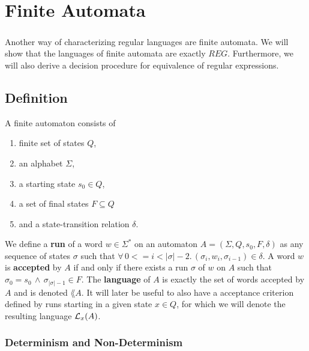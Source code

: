 \documentclass[11pt,a4paper,oneside]{book}
\begin{document}
            

    \chapter{Finite Automata}
        \paragraph{} 
        Another way of characterizing regular languages are finite automata. 
        We will show that the languages of finite automata are exactly $REG$. 
        Furthermore, we will also derive a decision procedure for equivalence of regular expressions.

        \section{Definition}
            A finite automaton consists of
            \begin{enumerate}
                \item
                    finite set of states $Q$, 
                \item 
                    an alphabet $\Sigma$, 
                \item 
                    a starting state $s_0 \in Q$, 
                \item 
                    a set of final states $F \subseteq Q$ 
                \item 
                    and a state-transition relation $\delta$. \cite{DBLP:books/daglib/0011126}
            \end{enumerate}

                We define a \textbf{run} of a word $w \in \Sigma^*$ on an automaton $A = (\Sigma, Q, s_0, F, \delta)$ as any sequence of states $\sigma$ such that 
                $\forall \, 0 <= i < \vert\sigma\vert-2. \, (\sigma_i, w_i, \sigma_{i-1}) \in \delta$.
            A word $w$ is \textbf{accepted} by $A$ if and only if there exists a run $\sigma$ of $w$ on $A$ such that $\sigma_0 = s_0 \, \wedge \, \sigma_{\vert\sigma\vert-1} \in F$.
            The \textbf{language} of $A$ is exactly the set of words accepted by $A$ and is denoted $\lang{A}$. 
            It will later be useful to also have a acceptance criterion defined by runs starting in a given state $x \in Q$, for which we will denote the resulting language $\mathcal{L}_x(A)$.

            \subsection{Determinism and Non-Determinism}
\end{document}
